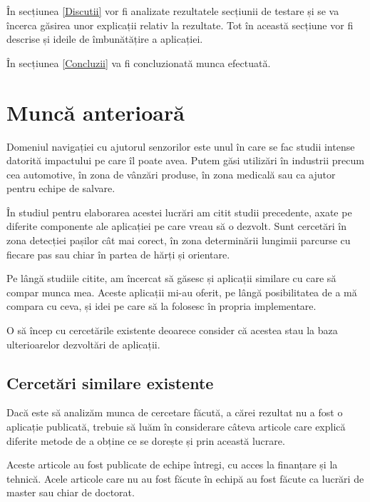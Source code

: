 \documentclass[12pt, a4paper, oneside]{article}
\begin{document}
În secțiunea \ref{Discutii} vor fi analizate rezultatele secțiunii de testare și se va încerca găsirea unor explicații relativ la rezultate. Tot în această secțiune vor fi descrise și ideile de îmbunătățire a aplicației.

În secțiunea \ref{Concluzii} va fi concluzionată munca efectuată.

\newpage


\section{Muncă anterioară} \label{AplicatiiCercetariSimilare}
Domeniul navigației cu ajutorul senzorilor este unul în care se fac studii intense datorită impactului pe care îl poate avea. Putem găsi utilizări în industrii precum cea automotive, în zona de vânzări produse, în zona medicală sau ca ajutor pentru echipe de salvare.

În studiul pentru elaborarea acestei lucrări am citit studii precedente, axate pe diferite componente ale aplicației pe care vreau să o dezvolt. Sunt cercetări în zona detecției pașilor cât mai corect, în zona determinării lungimii parcurse cu fiecare pas sau chiar în partea de hărți și orientare.

Pe lângă studiile citite, am încercat să găsesc și aplicații similare cu care să compar munca mea. Aceste aplicații mi-au oferit, pe lângă posibilitatea de a mă compara cu ceva, și idei pe care să la folosesc în propria implementare.

O să încep cu cercetările existente deoarece consider că acestea stau la baza ulterioarelor dezvoltări de aplicații.

\subsection{Cercetări similare existente}
Dacă este să analizăm munca de cercetare făcută, a cărei rezultat nu a fost o aplicație publicată, trebuie să luăm în considerare câteva articole care explică diferite metode de a obține ce se dorește și prin această lucrare.

Aceste articole au fost publicate de echipe întregi, cu acces la finanțare și la tehnică. Acele articole care nu au fost făcute în echipă au fost făcute ca lucrări de master sau chiar de doctorat. %
\end{document}
